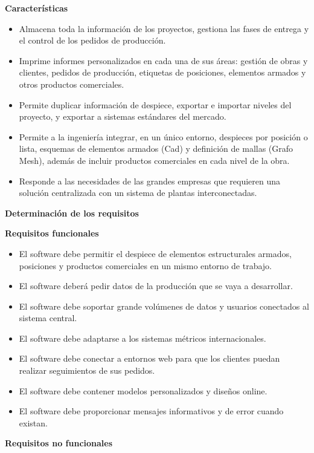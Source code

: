 \documentclass[10pt,a4paper]{article}
\begin{document}
\begin{enumerate}
\textbf{Características}

\begin{itemize}
\item Almacena toda la información de los proyectos, gestiona las fases de entrega y el control de los pedidos de producción.
\item Imprime informes personalizados en cada una de sus áreas: gestión de obras y clientes, pedidos de producción, etiquetas de posiciones, elementos armados y otros productos comerciales.
\item Permite duplicar información de despiece, exportar e importar niveles del proyecto, y exportar a sistemas estándares del mercado.
\item Permite a la ingeniería integrar, en un único entorno, despieces por posición o lista, esquemas de elementos armados (Cad) y definición de mallas (Grafo Mesh), además de incluir productos comerciales en cada nivel de la obra.
\item Responde a las necesidades de las grandes empresas que requieren una solución centralizada con un sistema de plantas interconectadas.
\end{itemize}

\textbf{Determinación de los requisitos}

\textbf{Requisitos funcionales}

\begin{itemize}
\item El software debe permitir el despiece de elementos estructurales armados, posiciones y productos comerciales en un mismo entorno de trabajo.
\item El software deberá pedir datos de la producción que se vaya a desarrollar.
\item El software debe soportar grande volúmenes de datos y usuarios conectados al sistema central.
\item El software debe adaptarse a los sistemas métricos internacionales.
\item El software debe conectar a entornos web para que los clientes puedan realizar seguimientos de sus pedidos.
\item El software debe contener modelos personalizados y diseños online.
\item El software debe proporcionar mensajes informativos y de error cuando existan.
\end{itemize}

\textbf{Requisitos no funcionales}


\end{enumerate}
\end{document}

